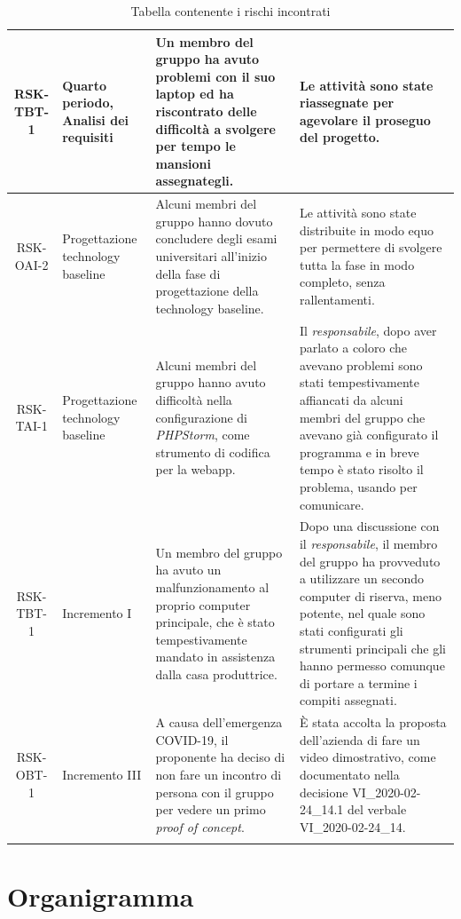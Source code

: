 \begin{center}
\begin{longtable}{|c|p{3cm}|p{4cm}|p{4cm}|}
			\hline
			RSK-TBT-1 & Quarto periodo, Analisi dei requisiti & Un membro del gruppo ha avuto problemi con il suo laptop ed ha riscontrato delle difficoltà a svolgere per tempo le mansioni assegnategli. & Le attività sono state riassegnate per agevolare il proseguo del progetto. \\
			\hline
			RSK-OAI-2 & Progettazione technology baseline &Alcuni membri del gruppo hanno dovuto concludere degli esami universitari all'inizio della fase di progettazione della technology baseline. & Le attività sono state distribuite in modo equo per permettere di svolgere tutta la fase in modo completo, senza rallentamenti. \\
			\hline
			RSK-TAI-1 & Progettazione technology baseline &Alcuni membri del gruppo hanno avuto difficoltà nella configurazione di \textit{PHPStorm}, come strumento di codifica per la webapp. & Il \textit{responsabile}, dopo aver parlato a coloro che avevano problemi sono stati tempestivamente affiancati da alcuni membri del gruppo che avevano già configurato il programma e in breve tempo è stato risolto il problema, usando \glock{Discord} per comunicare. \\
			\hline
			RSK-TBT-1 & Incremento I & Un membro del gruppo ha avuto un malfunzionamento al proprio computer principale, che è stato tempestivamente mandato in assistenza dalla casa produttrice. & Dopo una discussione con il \textit{responsabile}, il membro del gruppo ha provveduto a utilizzare un secondo computer di riserva, meno potente, nel quale sono stati configurati gli strumenti principali che gli hanno permesso comunque di portare a termine i compiti assegnati. \\
			\hline
			RSK-OBT-1 & Incremento III & A causa dell'emergenza COVID-19, il proponente ha deciso di non fare un incontro di persona con il gruppo per vedere un primo \textit{proof of concept}. & È stata accolta la proposta dell'azienda di fare un video dimostrativo, come documentato nella decisione VI\_2020-02-24\_14.1 del verbale VI\_2020-02-24\_14. \\
			\hline

			\caption{Tabella contenente i rischi incontrati}
			\end{longtable}
		\end{center}

	\section{Organigramma}
		
